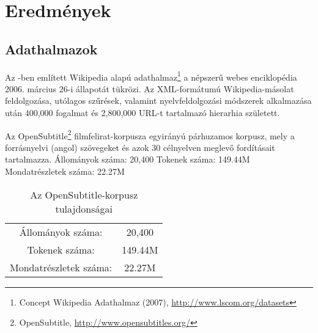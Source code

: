 \section{Eredmények} \label{sec:results}

\subsection{Adathalmazok}

Az \cite{Gabrilovich:2007:CSR}-ben említett Wikipedia alapú adathalmaz\footnote{Concept Wikipedia Adathalmaz (2007),  \url{http://www.lscom.org/datasets}} a népszerű webes enciklopédia 2006. március 26-i állapotát tükrözi. Az XML-formátumú Wikipedia-másolat feldolgozása, utólagos szűrések, valamint nyelvfeldolgozási módszerek alkalmazása után 400,000 fogalmat és 2,800,000 URL-t tartalmazó hierarhia született. 

Az OpenSubtitle\footnote{OpenSubtitle, \url{http://www.opensubtitles.org/}} filmfelirat-korpusza \cite{Tiedemann:RANLP5} egyirányú párhuzamos korpusz, mely a forrásnyelvi (angol) szövegeket és azok 30 célnyelven meglevő fordításait tartalmazza.
Állományok száma: 20,400
Tokenek száma: 149.44M
Mondatrészletek száma: 22.27M



\begin{table}[h!]
\centering
\normalsize
 \begin{tabular}{| c | c |} 
 \hline\hline
 Állományok száma: & 20,400 \\ [1ex]
 
 Tokenek száma: & 149.44M \\ [1ex]
 
  Mondatrészletek száma: & 22.27M  \\ [1ex] 
 \hline
 \end{tabular}
 \caption{Az OpenSubtitle-korpusz tulajdonságai}
\end{table}

